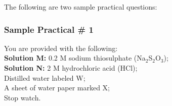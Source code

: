 %
%
%

\noindent The following are two sample practical questions:

\subsubsection{Sample Practical \# 1}

\noindent You are provided with the following: \\
\noindent \textbf{Solution M:} 0.2 M sodium thiosulphate (Na$_2$S$_2$O$_3$); \\
\noindent \textbf{Solution N:} 2 M hydrochloric acid (HCl); \\
\noindent Distilled water labeled W; \\
\noindent A sheet of water paper marked X; \\
\noindent Stop watch. \\

